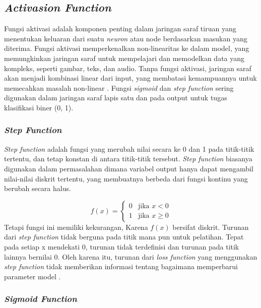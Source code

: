\subsection{\textit{Activasion Function}}

Fungsi aktivasi adalah komponen penting dalam jaringan saraf tiruan yang menentukan keluaran dari suatu \textit{neuron} atau node berdasarkan masukan yang diterima. Fungsi aktivasi memperkenalkan non-linearitas ke dalam model, yang memungkinkan jaringan saraf untuk mempelajari dan memodelkan data yang kompleks, seperti gambar, teks, dan audio. Tanpa fungsi aktivasi, jaringan saraf akan menjadi kombinasi linear dari input, yang membatasi kemampuannya untuk memecahkan masalah non-linear \cite{bishop_2006}. Fungsi \textit{sigmoid} dan \textit{step function} sering digunakan dalam jaringan saraf lapis satu dan pada output untuk tugas klasifikasi biner (0, 1).

\subsubsection{\textit{Step Function}}
\textit{Step function} adalah fungsi yang merubah nilai secara ke 0 dan 1 pada titik-titik tertentu, dan tetap konstan di antara titik-titik tersebut. \textit{Step function} biasanya digunakan dalam permasalahan dimana variabel output hanya dapat mengambil nilai-nilai diskrit tertentu, yang membuatnya berbeda dari fungsi kontinu yang berubah secara halus.

\begin{equation}
    f(x) = \begin{cases} 
0 & \text{jika } x < 0 \\
1 & \text{jika } x \geq 0 
\end{cases}
\end{equation}
Tetapi fungsi ini memiliki kekurangan, Karena $f(x)$ bersifat diskrit. Turunan dari \textit{step function} tidak berguna pada titik mana pun untuk pelatihan. Tepat pada setiap x mendekati 0, turunan tidak terdefinisi dan turunan pada titik lainnya bernilai 0. Oleh karena itu, turunan dari \textit{loss function} yang menggunakan \textit{step function} tidak memberikan informasi tentang bagaimana memperbarui parameter model \cite{GoodBengCour16}.

\subsubsection{\textit{Sigmoid Function}}

